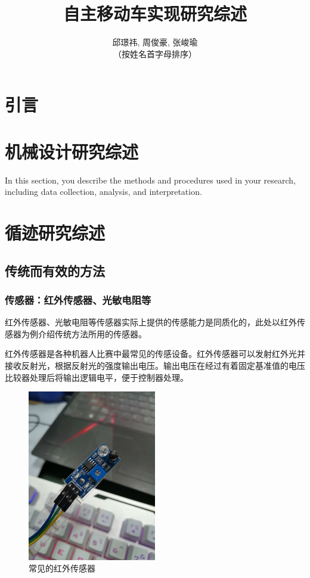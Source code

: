 \documentclass{paper}
\title{自主移动车实现研究综述}
\author{邱璟祎, 周俊豪, 张峻瑜\\
  （按姓名首字母排序）
}
\begin{document}
\maketitle
\tableofcontents
\newpage
\section{引言}


\section{机械设计研究综述}
In this section, you describe the methods and procedures used in your research, including data collection, analysis, and interpretation\cite{YOUSFI2017789}.

\section{循迹研究综述}
\subsection{传统而有效的方法\cite{intro2023robot}}
\label{subsec:label}
\subsubsection{传感器：红外传感器、光敏电阻等}
\label{subsec:label}
红外传感器、光敏电阻等传感器实际上提供的传感能力是同质化的，此处以红外传感器为例介绍传统方法所用的传感器。

红外传感器是各种机器人比赛中最常见的传感设备。红外传感器可以发射红外光并接收反射光，根据反射光的强度输出电压。输出电压在经过有着固定基准值的电压比较器处理后将输出逻辑电平，便于控制器处理。
\begin{figure}[ht]
  \centering
  \includegraphics[width=0.5\textwidth]{figures/sensor.jpg}
  \caption{ 常见的红外传感器}
\end{figure}
\end{document}

